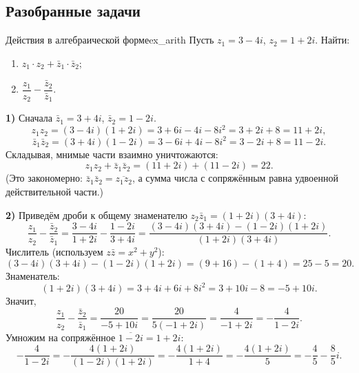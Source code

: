 \documentclass[12pt,a4paper]{article}
\begin{document}
\subsection*{Разобранные задачи}

\begin{definition}{Действия в алгебраической форме}{ex_arith}
Пусть $z_1 = 3 - 4i$, $z_2 = 1 + 2i$. Найти:
\begin{enumerate}
\item $z_1 \cdot z_2 + \bar{z}_1 \cdot \bar{z}_2$;
\item $\dfrac{z_1}{z_2} - \dfrac{\bar{z}_2}{\bar{z}_1}$.
\end{enumerate}

\textbf{1)} Сначала $\bar{z}_1 = 3 + 4i$, $\bar{z}_2 = 1 - 2i$.
\[
z_1 z_2 = (3 - 4i)(1 + 2i) = 3 + 6i - 4i - 8i^2 = 3 + 2i + 8 = 11 + 2i,
\]
\[
\bar{z}_1 \bar{z}_2 = (3 + 4i)(1 - 2i)
= 3 - 6i + 4i - 8i^2 = 3 - 2i + 8 = 11 - 2i.
\]
Складывая, мнимые части взаимно уничтожаются:
\[
z_1 z_2 + \bar{z}_1 \bar{z}_2 = (11 + 2i) + (11 - 2i) = 22.
\]
(Это закономерно: $\bar{z}_1\bar{z}_2 = \overline{z_1 z_2}$, а сумма
числа с сопряжённым равна удвоенной действительной части.)

\textbf{2)} Приведём дроби к общему знаменателю
$z_2 \bar{z}_1 = (1 + 2i)(3 + 4i)$:
\[
\frac{z_1}{z_2} - \frac{\bar{z}_2}{\bar{z}_1}
= \frac{3 - 4i}{1 + 2i} - \frac{1 - 2i}{3 + 4i}
= \frac{(3 - 4i)(3 + 4i) - (1 - 2i)(1 + 2i)}{(1 + 2i)(3 + 4i)}.
\]
Числитель (используем $z\bar z = x^2 + y^2$):
\[
(3 - 4i)(3 + 4i) - (1 - 2i)(1 + 2i)
= (9 + 16) - (1 + 4) = 25 - 5 = 20.
\]
Знаменатель:
\[
(1 + 2i)(3 + 4i) = 3 + 4i + 6i + 8i^2 = 3 + 10i - 8 = -5 + 10i.
\]
Значит,
\[
\frac{z_1}{z_2} - \frac{\bar{z}_2}{\bar{z}_1}
= \frac{20}{-5 + 10i} = \frac{20}{5(-1 + 2i)} = \frac{4}{-1 + 2i}
= -\frac{4}{1 - 2i}.
\]
Умножим на сопряжённое $\overline{1 - 2i} = 1 + 2i$:
\[
-\frac{4}{1 - 2i} = -\frac{4(1 + 2i)}{(1 - 2i)(1 + 2i)}
= -\frac{4(1 + 2i)}{1 + 4} = -\frac{4(1 + 2i)}{5}
= -\frac{4}{5} - \frac{8}{5}i.
\]
\end{definition}
\end{document}
